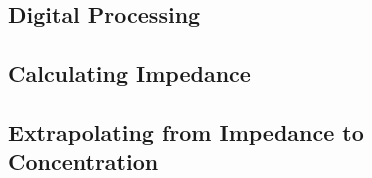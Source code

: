\subsection{Digital Processing}

\subsection{Calculating Impedance}



\subsection{Extrapolating from Impedance to Concentration}



